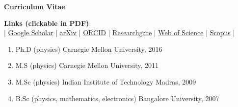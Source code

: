 \documentclass[10pt]{article}
\begin{document}
\begin{center}
	\textbf{Curriculum Vitae}
\end{center}
\begin{minipage}[t]{0.85\textwidth}\vspace{0pt}
    \vspace{0.3cm}

\end{minipage}
\begin{minipage}[t]{0.15\textwidth}\vspace{0pt}
\end{minipage}
\vspace{-0.1cm} 
\begin{center}
    \textbf{Links (clickable in PDF)}: \\ |
    \href{https://scholar.google.com/citations?user=hsYqvQIAAAAJ&hl=en&oi=ao}{Google Scholar} | 
    \href{https://arxiv.org/a/maddali_s_1.html}{arXiv} |
    \href{https://orcid.org/0000-0003-4516-6250}{ORCID} |
    \href{https://www.researchgate.net/profile/Siddharth_Maddali}{Researchgate} |
    \href{https://www.webofscience.com/wos/author/record/1891174}{Web of Science} | 
    \href{https://www.scopus.com/authid/detail.uri?authorId=57045870900}{Scopus} | 
\end{center} 
\begin{enumerate}
    \item Ph.D (physics) \hfill Carnegie Mellon University, 2016
    \item M.S (physics) \hfill Carnegie Mellon University, 2011
    \item M.Sc (physics) \hfill Indian Institute of Technology Madras, 2009
    \item B.Sc (physics, mathematics, electronics) \hfill Bangalore University, 2007
\end{enumerate} 
\end{document}

